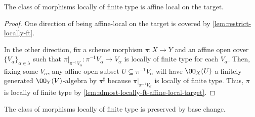 \documentclass[../notes.tex]{subfiles}
\begin{document}
\begin{corollary} \label{cor:locally-ft-affine-local-target}
	The class of morphisms locally of finite type is affine local on the target.
\end{corollary}
\begin{proof}
	One direction of being affine-local on the target is covered by \autoref{lem:restrict-locally-ft}.

	In the other direction, fix a scheme morphism $\pi\colon X\to Y$ and an affine open cover $\{V_\alpha\}_{\alpha\in\lambda}$ such that $\pi|_{\pi^{-1}V_\alpha}\colon\pi^{-1}V_\alpha\to V_\alpha$ is locally of finite type for each $V_\alpha$. Then, fixing some $V_\alpha$, any affine open subset $U\subseteq\pi^{-1}V_\alpha$ will have $\OO_X(U)$ a finitely generated $\OO_Y(V)$-algebra by $\pi^\sharp$ because $\pi|_{\pi^{-1}V_\alpha}$ is locally of finite type. Thus, $\pi$ is locally of finite type by \autoref{lem:almost-locally-ft-affine-local-target}.
\end{proof}
\begin{lemma}
	The class of morphisms locally of finite type is preserved by base change.
\end{lemma}
\end{document}
